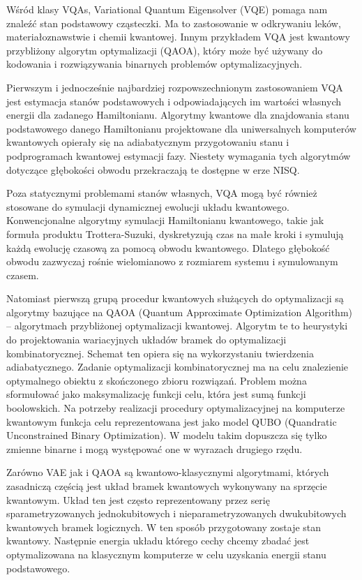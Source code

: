 \documentclass[a4paper,11pt]{article}
\begin{document}
Wśród klasy VQAs, Variational Quantum Eigensolver (VQE) pomaga nam znaleźć stan podstawowy cząsteczki. Ma to zastosowanie w odkrywaniu leków, materiałoznawstwie i chemii kwantowej. Innym przykładem VQA jest kwantowy przybliżony algorytm optymalizacji (QAOA), który może być używany do kodowania i rozwiązywania binarnych problemów optymalizacyjnych.

Pierwszym i jednocześnie najbardziej rozpowszechnionym zastosowaniem VQA jest estymacja stanów podstawowych i odpowiadających im wartości własnych energii dla zadanego Hamiltonianu. Algorytmy kwantowe dla znajdowania stanu podstawowego danego Hamiltonianu projektowane dla uniwersalnych komputerów kwantowych opierały się na adiabatycznym przygotowaniu stanu i podprogramach kwantowej estymacji fazy. Niestety wymagania tych algorytmów dotyczące głębokości obwodu przekraczają te dostępne w erze NISQ.


Poza statycznymi problemami stanów własnych, VQA mogą być również stosowane do symulacji dynamicznej ewolucji układu kwantowego. Konwencjonalne algorytmy symulacji Hamiltonianu kwantowego, takie jak formuła produktu Trottera-Suzuki,  dyskretyzują czas na małe kroki i symulują każdą ewolucję czasową za pomocą obwodu kwantowego. Dlatego głębokość obwodu zazwyczaj rośnie wielomianowo z rozmiarem systemu i symulowanym czasem.

Natomiast pierwszą grupą procedur kwantowych służących do optymalizacji są algorytmy bazujące na QAOA (Quantum Approximate Optimization Algorithm) -- algorytmach przybliżonej optymalizacji kwantowej. Algorytm te to heurystyki do projektowania wariacyjnych układów bramek do optymalizacji kombinatorycznej. Schemat ten opiera się na wykorzystaniu twierdzenia adiabatycznego. Zadanie optymalizacji kombinatorycznej ma na celu znalezienie optymalnego obiektu z skończonego zbioru rozwiązań. Problem można sformułować jako maksymalizację funkcji celu, która jest sumą funkcji boolowskich.
Na potrzeby realizacji procedury optymalizacyjnej na komputerze kwantowym funkcja celu reprezentowana jest jako model QUBO (Quandratic Unconstrained Binary Optimization). W modelu takim dopuszcza się tylko zmienne binarne i mogą występować one w wyrazach drugiego rzędu.

Zarówno VAE jak i QAOA są kwantowo-klasycznymi algorytmami, których zasadniczą częścią jest układ bramek kwantowych wykonywany na sprzęcie kwantowym. Układ ten jest często reprezentowany przez serię sparametryzowanych jednokubitowych i nieparametryzowanych dwukubitowych kwantowych bramek logicznych. W ten sposób przygotowany zostaje stan kwantowy. Następnie energia układu którego cechy chcemy zbadać jest optymalizowana na klasycznym komputerze w celu uzyskania energii stanu podstawowego. 
\end{document}
